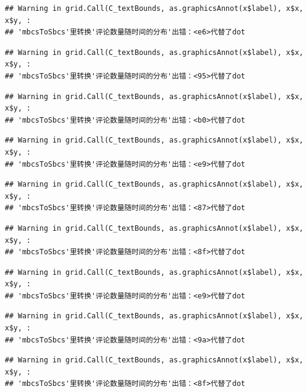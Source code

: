 \documentclass[
]{article}
\begin{document}
\begin{verbatim}
## Warning in grid.Call(C_textBounds, as.graphicsAnnot(x$label), x$x, x$y, :
## 'mbcsToSbcs'里转换'评论数量随时间的分布'出错：<e6>代替了dot
\end{verbatim}

\begin{verbatim}
## Warning in grid.Call(C_textBounds, as.graphicsAnnot(x$label), x$x, x$y, :
## 'mbcsToSbcs'里转换'评论数量随时间的分布'出错：<95>代替了dot
\end{verbatim}

\begin{verbatim}
## Warning in grid.Call(C_textBounds, as.graphicsAnnot(x$label), x$x, x$y, :
## 'mbcsToSbcs'里转换'评论数量随时间的分布'出错：<b0>代替了dot
\end{verbatim}

\begin{verbatim}
## Warning in grid.Call(C_textBounds, as.graphicsAnnot(x$label), x$x, x$y, :
## 'mbcsToSbcs'里转换'评论数量随时间的分布'出错：<e9>代替了dot
\end{verbatim}

\begin{verbatim}
## Warning in grid.Call(C_textBounds, as.graphicsAnnot(x$label), x$x, x$y, :
## 'mbcsToSbcs'里转换'评论数量随时间的分布'出错：<87>代替了dot
\end{verbatim}

\begin{verbatim}
## Warning in grid.Call(C_textBounds, as.graphicsAnnot(x$label), x$x, x$y, :
## 'mbcsToSbcs'里转换'评论数量随时间的分布'出错：<8f>代替了dot
\end{verbatim}

\begin{verbatim}
## Warning in grid.Call(C_textBounds, as.graphicsAnnot(x$label), x$x, x$y, :
## 'mbcsToSbcs'里转换'评论数量随时间的分布'出错：<e9>代替了dot
\end{verbatim}

\begin{verbatim}
## Warning in grid.Call(C_textBounds, as.graphicsAnnot(x$label), x$x, x$y, :
## 'mbcsToSbcs'里转换'评论数量随时间的分布'出错：<9a>代替了dot
\end{verbatim}

\begin{verbatim}
## Warning in grid.Call(C_textBounds, as.graphicsAnnot(x$label), x$x, x$y, :
## 'mbcsToSbcs'里转换'评论数量随时间的分布'出错：<8f>代替了dot
\end{verbatim}
\end{document}
